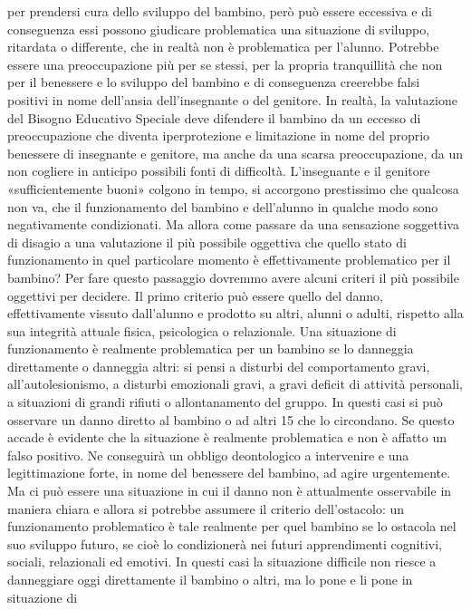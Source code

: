 per prendersi cura dello sviluppo del bambino, però può essere eccessiva e di conseguenza essi
possono giudicare problematica una situazione di sviluppo, ritardata o differente, che in realtà non
è problematica per l’alunno. Potrebbe essere una preoccupazione più per se stessi, per la propria
tranquillità che non per il benessere e lo sviluppo del bambino e di conseguenza creerebbe falsi
positivi in nome dell’ansia dell’insegnante o del genitore.
In realtà, la valutazione del Bisogno Educativo Speciale deve difendere il bambino da un
eccesso di preoccupazione che diventa iperprotezione e limitazione in nome del proprio benessere
di insegnante e genitore, ma anche da una scarsa preoccupazione, da un non cogliere in anticipo
possibili fonti di difficoltà.
L’insegnante e il genitore «sufficientemente buoni» colgono in tempo, si accorgono
prestissimo che qualcosa non va, che il funzionamento del bambino e dell’alunno in qualche modo
sono negativamente condizionati. Ma allora come passare da una sensazione soggettiva di disagio
a una valutazione il più possibile oggettiva che quello stato di funzionamento in quel particolare
momento è effettivamente problematico per il bambino? Per fare questo passaggio dovremmo
avere alcuni criteri il più possibile oggettivi per decidere.
Il primo criterio può essere quello del danno, effettivamente vissuto dall’alunno e prodotto su
altri, alunni o adulti, rispetto alla sua integrità attuale fisica, psicologica o relazionale. Una
situazione di funzionamento è realmente problematica per un bambino se lo danneggia
direttamente o danneggia altri: si pensi a disturbi del comportamento gravi, all’autolesionismo, a
disturbi emozionali gravi, a gravi deficit di attività personali, a situazioni di grandi rifiuti o
allontanamento del gruppo. In questi casi si può osservare un danno diretto al bambino o ad altri
15
che lo circondano. Se questo accade è evidente che la situazione è realmente problematica e non è
affatto un falso positivo. Ne conseguirà un obbligo deontologico a intervenire e una legittimazione
forte, in nome del benessere del bambino, ad agire urgentemente.
Ma ci può essere una situazione in cui il danno non è attualmente osservabile in maniera
chiara e allora si potrebbe assumere il criterio dell’ostacolo: un funzionamento problematico è tale
realmente per quel bambino se lo ostacola nel suo sviluppo futuro, se cioè lo condizionerà nei
futuri apprendimenti cognitivi, sociali, relazionali ed emotivi. In questi casi la situazione difficile
non riesce a danneggiare oggi direttamente il bambino o altri, ma lo pone e li pone in situazione di

